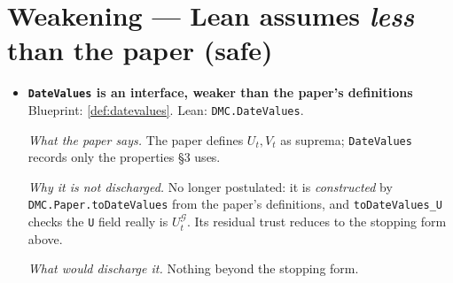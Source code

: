 \section*{Weakening --- Lean assumes \emph{less} than the paper (safe)}
\begin{itemize}
  \item[] \textbf{\texttt{DateValues} is an interface, weaker than the paper's definitions}\\
  Blueprint: \ref{def:datevalues}. Lean: \texttt{DMC.DateValues}.
  \par\smallskip\emph{What the paper says.} The paper defines $U_t,V_t$ as suprema; \texttt{DateValues} records only the properties \S3 uses.
  \par\smallskip\emph{Why it is not discharged.} No longer postulated: it is \emph{constructed} by \texttt{DMC.Paper.toDateValues} from the paper's definitions, and \texttt{toDateValues\_U} checks the \texttt{U} field really is $U_t^{\mathcal G}$. Its residual trust reduces to the stopping form above.
  \par\smallskip\emph{What would discharge it.} Nothing beyond the stopping form.
\end{itemize}
